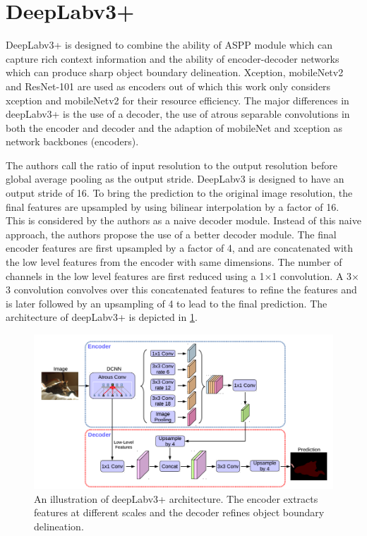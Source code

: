 \section{DeepLabv3+}

DeepLabv3+ is designed to combine the ability of ASPP module which can capture rich context information and the ability of encoder-decoder networks which can produce sharp object boundary delineation. Xception, mobileNetv2 and ResNet-101 are used as encoders out of which this work only considers xception and mobileNetv2 for their resource efficiency. The major differences in deepLabv3+ is the use of a decoder, the use of atrous separable convolutions in both the encoder and decoder and the adaption of mobileNet and xception as network backbones (encoders).

The authors call the ratio of input resolution to the output resolution before global average pooling as the output stride. DeepLabv3 is designed to have an output stride of 16. To bring the prediction to the original image resolution, the final features are upsampled by using bilinear interpolation by a factor of 16. This is considered by the authors as a naive decoder module. Instead of this naive approach, the authors propose the use of a better decoder module. The final encoder features are first upsampled by a factor of 4, and are concatenated with the low level features from the encoder with same dimensions. The number of channels in the low level features are first reduced using a 1$\times$1 convolution. A 3$\times$3 convolution convolves over this concatenated features to refine the features and is later followed by an upsampling of 4 to lead to the final prediction. The architecture of deepLabv3+ is depicted in \ref{Fig:deepLabv4}.

	\begin{figure}
		\centering
		\includegraphics[width=1\linewidth]{images/deepLabv4}
		\caption{An illustration of deepLabv3+ architecture. The encoder extracts features at different scales and the decoder refines object boundary delineation.}
		\label{Fig:deepLabv4}
	\end{figure}

